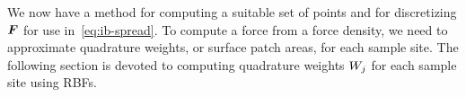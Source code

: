 We now have a method for computing a suitable set of points and for discretizing $\boldsymbol{F}$ for
use in~\eqref{eq:ib-spread}. To compute a force from a force density, we need to
approximate quadrature weights, or surface patch areas, for each sample site. The
following section is devoted to computing quadrature weights $\weight[j]$ for each
sample site using RBFs.

